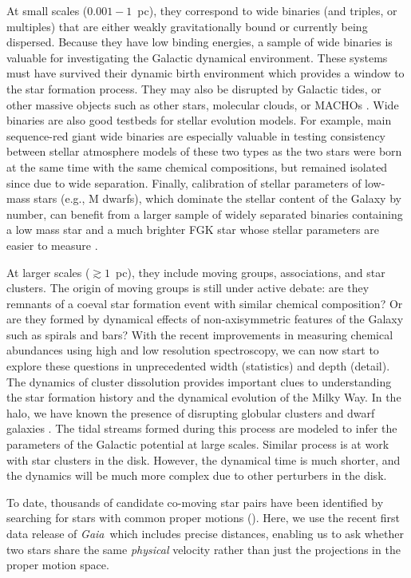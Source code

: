 \documentclass[manuscript, letterpaper]{aastex6}
\newcommand{\project}[1]{\textsl{#1}}
\newcommand{\gaia}{\project{Gaia}}
\begin{document}
At small scales ($0.001-1$~pc), they correspond to wide binaries (and triples, or
multiples) that are
either weakly gravitationally bound or currently being dispersed.
Because they have low binding energies,
a sample of wide binaries is valuable for investigating
the Galactic dynamical environment.
These systems must have survived their dynamic birth environment which
provides a window to the star formation process.
They may also be disrupted by Galactic tides, or other massive objects
such as other stars, molecular clouds, or MACHOs \citep{Yoo:2004aa,Allen:2014aa}.
Wide binaries are also good testbeds for stellar evolution models.
For example, main sequence-red giant wide binaries are especially valuable
in testing consistency between stellar atmosphere models of these two types
as the two stars were born at the same time with the same chemical compositions,
but remained isolated since due to wide separation.
Finally, calibration of stellar parameters of low-mass stars (e.g., M dwarfs),
which dominate the stellar content of the Galaxy by number, can benefit from
a larger sample of widely separated binaries containing a low mass star and a
much brighter FGK star whose stellar parameters are easier to measure
\citep[e.g.,][]{Rojas-Ayala:2012aa}.

At larger scales ($\gtrsim 1$~pc), they include moving groups, associations, and star clusters.
The origin of moving groups is still under active debate: are they remnants of a coeval
star formation event with similar chemical composition? Or are they formed by
dynamical effects of non-axisymmetric features of the Galaxy such as spirals
and bars? With the recent improvements in measuring chemical abundances
using high and low resolution spectroscopy, we can now start to explore these questions
in unprecedented width (statistics) and depth (detail). 
The dynamics of cluster dissolution provides important clues to understanding
the star formation history and the dynamical evolution of the Milky Way.
In the halo, we have known the presence of disrupting globular clusters and dwarf galaxies
\citep[e.g.,][]{Ibata:1994aa}.
The tidal streams formed during this process are modeled to infer the
parameters of the Galactic potential at large scales.
Similar process is at work with star clusters in the disk. However, the dynamical
time is much shorter, and the dynamics will be much more complex due to other
perturbers in the disk.

To date, thousands of candidate co-moving star pairs have been identified by
searching for stars with common proper motions
(\citealt{Poveda:1994aa,Allen:2000aa,Chaname:2004aa,Lepine:2007aa,Alonso-Floriano:2015aa}).
Here, we use the recent first data release of \gaia\ which includes precise distances,
enabling us to ask whether two stars share the same {\it physical} velocity rather than
just the projections in the proper motion space.
\end{document}
